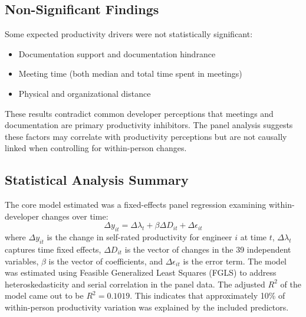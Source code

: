 \subsection{Non-Significant Findings}
Some expected productivity drivers were not statistically significant:
\begin{itemize}
    \item Documentation support and documentation hindrance
    \item Meeting time (both median and total time spent in meetings)
    \item Physical and organizational distance
\end{itemize}
These results contradict common developer perceptions that meetings and documentation are primary productivity inhibitors. The panel analysis suggests these factors may correlate with productivity perceptions but are not causally linked when controlling for within-person changes.

\subsection{Statistical Analysis Summary}
The core model estimated was a fixed-effects panel regression examining within-developer changes over time:
\begin{equation}
    \Delta y_{it} = \Delta \lambda_t + \beta\Delta  D_{it} + \Delta \epsilon_{it}
\end{equation}
where $\Delta y_{it}$ is the change in self-rated productivity for engineer $i$ at time $t$, $\Delta \lambda_t$ captures time fixed effects, $\Delta D_{it}$ is the vector of changes in the 39 independent variables, $\beta$ is the vector of coefficients, and $\Delta \epsilon_{it}$ is the error term. The model was estimated using Feasible Generalized Least Squares (FGLS) to address heteroskedasticity and serial correlation in the panel data. The adjusted $R^2$ of the model came out to be $R^2 = 0.1019$. This indicates that approximately 10\% of within-person productivity variation was explained by the included predictors.

